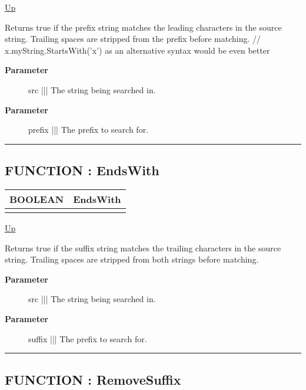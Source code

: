 \hyperlink{ecldoc:Str}{Up}

\par
Returns true if the prefix string matches the leading characters in the source string. Trailing spaces are stripped from the prefix before matching. // x.myString.StartsWith('x') as an alternative syntax would be even better

\par
\begin{description}
\item [\textbf{Parameter}] src ||| The string being searched in.
\item [\textbf{Parameter}] prefix ||| The prefix to search for.
\end{description}

\rule{\textwidth}{0.4pt}
\subsection*{FUNCTION : EndsWith}
\hypertarget{ecldoc:str.endswith}{}

{\renewcommand{\arraystretch}{1.5}
\begin{tabularx}{\textwidth}{|>{\raggedright\arraybackslash}l|X|}
\hline
\hspace{0pt}BOOLEAN & EndsWith \\
\hline
\multicolumn{2}{|>{\raggedright\arraybackslash}X|}{\hspace{0pt}(STRING src, STRING suffix)} \\
\hline
\end{tabularx}
}

\hyperlink{ecldoc:Str}{Up}

\par
Returns true if the suffix string matches the trailing characters in the source string. Trailing spaces are stripped from both strings before matching.

\par
\begin{description}
\item [\textbf{Parameter}] src ||| The string being searched in.
\item [\textbf{Parameter}] suffix ||| The prefix to search for.
\end{description}

\rule{\textwidth}{0.4pt}
\subsection*{FUNCTION : RemoveSuffix}
\hypertarget{ecldoc:str.removesuffix}{}


